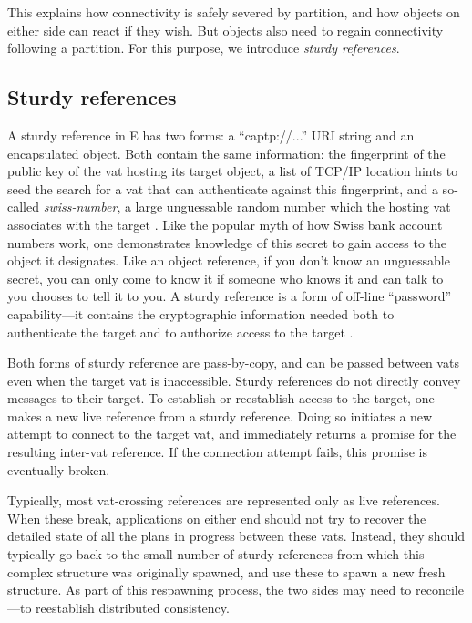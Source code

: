 \documentclass{llncs}
\begin{document}
This explains how connectivity is safely severed by partition, and how
objects on either side can react if they wish. But objects also need
to regain connectivity following a partition. For this purpose, we
introduce \emph{sturdy references}.

\subsection{Sturdy references}

A sturdy reference in E has two forms: a ``captp://...'' URI string
and an encapsulated  object. Both contain the same
information: the fingerprint of the public key of the vat hosting its
target object, a list of TCP/IP location hints to seed the search for
a vat that can authenticate against this fingerprint, and a so-called
\emph{swiss-number}, a large unguessable random number which the
hosting vat associates with the target \cite{tyler:yurl}. Like the
popular myth of how Swiss bank account numbers work, one demonstrates
knowledge of this secret to gain access to the object it designates.
Like an object reference, if you don't know an unguessable secret, you
can only come to know it if someone who knows it and can talk to you
chooses to tell it to you. A sturdy reference is a form of off-line
``password'' capability---it contains the cryptographic information
needed both to authenticate the target and to authorize access to the
target \cite{jed:dccs}.

Both forms of sturdy reference are pass-by-copy, and can be passed
between vats even when the target vat is inaccessible. Sturdy
references do not directly convey messages to their target. To
establish or reestablish access to the target, one makes a new live
reference from a sturdy reference. Doing so initiates a new attempt to
connect to the target vat, and immediately returns a promise for the
resulting inter-vat reference. If the connection attempt fails, this
promise is eventually broken.

Typically, most vat-crossing references are represented only as live
references. When these break, applications on either end should not
try to recover the detailed state of all the plans in progress between
these vats. Instead, they should typically go back to the small number
of sturdy references from which this complex structure was originally
spawned, and use these to spawn a new fresh structure. As part of this
respawning process, the two sides may need to reconcile---to
reestablish distributed consistency.
\end{document}
